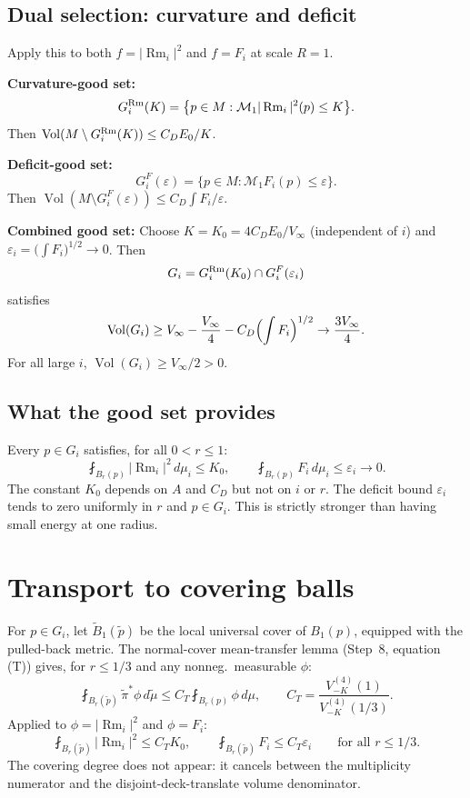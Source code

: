 \subsection{Dual selection: curvature and deficit}
Apply this to both $f = |\operatorname{Rm}_i|^2$ and $f = F_i$ at scale $R = 1$.

\medskip\noindent
\textbf{Curvature-good set:}
\[
G_i^{\rm Rm}(K) = \bigl\{p \in M : \mathcal{M}_1 |\operatorname{Rm}_i|^2(p) \le K\bigr\}.
\]
Then $\operatorname{Vol}(M \setminus G_i^{\rm Rm}(K)) \le C_D E_0 / K$.

\medskip\noindent
\textbf{Deficit-good set:}
\[
G_i^F(\varepsilon) = \bigl\{p \in M : \mathcal{M}_1 F_i(p) \le \varepsilon\bigr\}.
\]
Then $\operatorname{Vol}(M \setminus G_i^F(\varepsilon)) \le C_D \int F_i / \varepsilon$.

\medskip\noindent
\textbf{Combined good set:} Choose $K = K_0 = 4 C_D E_0 / V_\infty$ (independent of $i$)
and $\varepsilon_i = \bigl(\int F_i\bigr)^{1/2} \to 0$. Then
\[
G_i = G_i^{\rm Rm}(K_0) \cap G_i^F(\varepsilon_i)
\]
satisfies
\[
\operatorname{Vol}(G_i) \ge V_\infty - \frac{V_\infty}{4}
- C_D \Bigl(\int F_i\Bigr)^{1/2} \to \frac{3V_\infty}{4}.
\]
For all large $i$, $\operatorname{Vol}(G_i) \ge V_\infty/2 > 0$.

\subsection{What the good set provides}
Every $p \in G_i$ satisfies, for all $0 < r \le 1$:
\begin{equation}\label{eq:good-point}
\fint_{B_r(p)} |\operatorname{Rm}_i|^2\,d\mu_i \le K_0,
\qquad
\fint_{B_r(p)} F_i\,d\mu_i \le \varepsilon_i \to 0.
\end{equation}
The constant $K_0$ depends on $A$ and $C_D$ but not on $i$ or $r$.
The deficit bound $\varepsilon_i$ tends to zero uniformly in $r$ and $p \in G_i$.
This is strictly stronger than having small energy at one radius.

\section{Transport to covering balls}

For $p \in G_i$, let $\widetilde{B}_1(\tilde p)$ be the local universal cover
of $B_1(p)$, equipped with the pulled-back metric.
The normal-cover mean-transfer lemma (Step~8, equation (T)) gives,
for $r \le 1/3$ and any nonneg.\ measurable $\phi$:
\[
\fint_{B_r(\tilde p)} \tilde\pi^*\phi\,d\tilde\mu
\le C_T \fint_{B_r(p)} \phi\,d\mu,
\qquad C_T = \frac{V_{-K}^{(4)}(1)}{V_{-K}^{(4)}(1/3)}.
\]
Applied to $\phi = |\operatorname{Rm}_i|^2$ and $\phi = F_i$:
\begin{equation}\label{eq:cover-good}
\fint_{B_r(\tilde p)} |\operatorname{Rm}_i|^2 \le C_T K_0,
\qquad
\fint_{B_r(\tilde p)} F_i \le C_T \varepsilon_i
\qquad\text{for all } r \le 1/3.
\end{equation}
The covering degree does not appear: it cancels between the multiplicity
numerator and the disjoint-deck-translate volume denominator.

